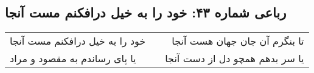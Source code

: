 \begin{center}
\section*{رباعی شماره ۴۳: خود را به خیل درافکنم مست آنجا}
\label{sec:0043}
\begin{longtable}{l p{0.5cm} r}
خود را به خیل درافکنم مست آنجا
&&
تا بنگرم آن جان جهان هست آنجا
\\
یا پای رساندم به مقصود و مراد
&&
یا سر بدهم همچو دل از دست آنجا
\\
\end{longtable}
\end{center}
